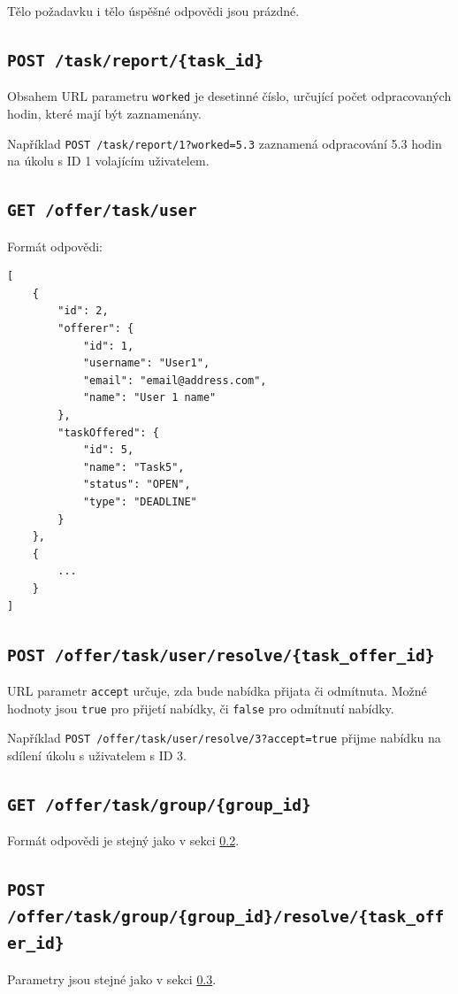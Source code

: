\documentclass[thesis=B,czech]{FITthesis}[2012/06/26]
\begin{document}
			
			
			Tělo požadavku i tělo úspěšné odpovědi jsou prázdné.
		
		\subsection{\texttt{POST /task/report/\{task\_id\}}}
			Obsahem URL parametru \texttt{worked} je desetinné číslo, určující počet odpracovaných hodin, které mají být zaznamenány.
			
			Například \texttt{POST /task/report/1?worked=5.3} zaznamená odpracování 5.3 hodin na úkolu s ID 1 volajícím uživatelem.
			
			
		\subsection{\texttt{GET /offer/task/user}}
			\label{endpoint:offerTaskUser}
			Formát odpovědi:
			\begin{Verbatim}[obeytabs,tabsize=2]
[
	{
		"id": 2,
		"offerer": {
			"id": 1,
			"username": "User1",
			"email": "email@address.com",
			"name": "User 1 name"
		},
		"taskOffered": {
			"id": 5,
			"name": "Task5",
			"status": "OPEN",
			"type": "DEADLINE"
		}
	},
	{
		...
	}
]
			\end{Verbatim}
		
		\subsection{\texttt{POST /offer/task/user/resolve/\{task\_offer\_id\}}}
			\label{endpoint:offerTaskUserResolve}
			URL parametr \texttt{accept} určuje, zda bude nabídka přijata či odmítnuta. Možné hodnoty jsou \texttt{true} pro přijetí nabídky, či \texttt{false} pro odmítnutí nabídky.
			
			Například \texttt{POST /offer/task/user/resolve/3?accept=true} přijme nabídku na sdílení úkolu s uživatelem s ID 3.
		
		\subsection{\texttt{GET /offer/task/group/\{group\_id\}}}
		Formát odpovědi je stejný jako v sekci \ref{endpoint:offerTaskUser}.
		
		\subsection{\texttt{POST /offer/task/group/\{group\_id\}/resolve/\{task\_offer\_id\}}}
			Parametry jsou stejné jako v sekci \ref{endpoint:offerTaskUserResolve}.
		
\end{document}
